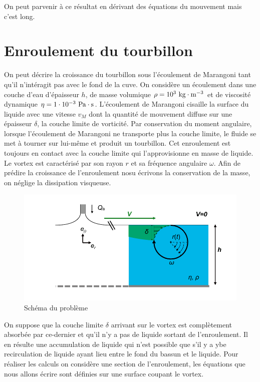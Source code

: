 \documentclass[french, 10pt]{article}
\begin{document}
On peut parvenir à ce résultat en dérivant des équations du mouvement mais c'est long.

\section{Enroulement du tourbillon}

On peut décrire la croissance du tourbillon sous l'écoulement de Marangoni tant qu'il n'intéragit pas avec le fond de la cuve. On considère un écoulement dans une couche d'eau d'épaisseur $h$, de masse volumique $\rho=10^3~\rm kg\cdot m^{-3}$ et de viscosité dynamique $\eta=1\cdot 10^{-3}~\rm Pa\cdot s$. L'écoulement de Marangoni cisaille la surface du liquide avec une vitesse $v_M$ dont la quantité de mouvement diffuse sur une épaisseur $\delta$, la couche limite de vorticité. Par conservation du moment angulaire, lorsque l'écoulement de Marangoni ne transporte plus la couche limite, le fluide se met à tourner sur lui-même et produit un tourbillon. Cet enroulement est toujours en contact avec la couche limite qui l'approvisionne en masse de liquide. Le vortex est caractérisé par son rayon $r$ et sa fréquence angulaire $\omega$. Afin de prédire la croissance de l'enroulement nosu écrivons la conservation de la masse, on néglige la dissipation visqueuse.
\begin{figure}[ht]
  \centering
  \includegraphics[width=.7\textwidth]{Schema_enroulement_v2.pdf}
  \caption{Schéma du problème}
\end{figure}

On suppose que la couche limite $\delta$ arrivant sur le vortex est complètement absorbée par ce-dernier et qu'il n'y a pas de liquide sortant de l'enroulement. Il en résulte une accumulation de liquide qui n'est possible que s'il y a ybe recirculation de liquide ayant lieu entre le fond du bassun et le liquide. Pour réaliser les calculs on considère une section de l'enroulement, les équations que nous allons écrire sont définies sur une surface coupant le vortex.\medskip
\end{document}
